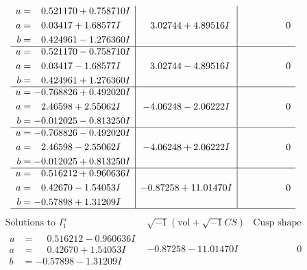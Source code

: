 \documentclass[1p]{elsarticle_modified}
\theoremstyle{definition}
\newcommand{\I}{\sqrt{-1}}
\begin{document}
$$\begin{array}{c|c|c}
\begin{aligned}
u &= \phantom{-}0.521170 + 0.758710 I \\
a &= \phantom{-}0.03417 + 1.68577 I \\
b &= \phantom{-}0.424961 - 1.276360 I\end{aligned}
 & \phantom{-}3.02744 + 4.89516 I & \phantom{-0.000000 } 0 \\ \hline\begin{aligned}
u &= \phantom{-}0.521170 - 0.758710 I \\
a &= \phantom{-}0.03417 - 1.68577 I \\
b &= \phantom{-}0.424961 + 1.276360 I\end{aligned}
 & \phantom{-}3.02744 - 4.89516 I & \phantom{-0.000000 } 0 \\ \hline\begin{aligned}
u &= -0.768826 + 0.492020 I \\
a &= \phantom{-}2.46598 + 2.55062 I \\
b &= -0.012025 - 0.813250 I\end{aligned}
 & -4.06248 - 2.06222 I & \phantom{-0.000000 } 0 \\ \hline\begin{aligned}
u &= -0.768826 - 0.492020 I \\
a &= \phantom{-}2.46598 - 2.55062 I \\
b &= -0.012025 + 0.813250 I\end{aligned}
 & -4.06248 + 2.06222 I & \phantom{-0.000000 } 0 \\ \hline\begin{aligned}
u &= \phantom{-}0.516212 + 0.960636 I \\
a &= \phantom{-}0.42670 - 1.54053 I \\
b &= -0.57898 + 1.31209 I\end{aligned}
 & -0.87258 + 11.01470 I & \phantom{-0.000000 } 0\\
 \hline 
 \end{array}$$\newpage$$\begin{array}{c|c|c}  
\text{Solutions to }I^u_{1}& \I (\text{vol} + \sqrt{-1}CS) & \text{Cusp shape}\\
 \hline 
\begin{aligned}
u &= \phantom{-}0.516212 - 0.960636 I \\
a &= \phantom{-}0.42670 + 1.54053 I \\
b &= -0.57898 - 1.31209 I\end{aligned}
 & -0.87258 - 11.01470 I & \phantom{-0.000000 } 0 \\ \hline\begin{aligned}

\end{aligned}
\end{array}$$
\end{document}
